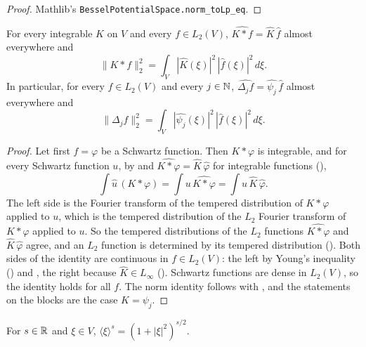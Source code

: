 \begin{proof}
\leanok
Mathlib's \texttt{BesselPotentialSpace.\allowbreak norm\_\allowbreak toLp\_\allowbreak eq}.
\end{proof}

\begin{theorem}
\label{thm:convolution-theorem-l2}
\leanok
{}
For every integrable $K$ on $V$ and every $f \in L_2(V)$,
$\widehat{K * f} = \widehat K \, \widehat f$ almost everywhere and
\[
  \|K * f\|_2^2 = \int_V |\widehat K(\xi)|^2 \, |\widehat f(\xi)|^2 \, d\xi .
\]
In particular, for every $f \in L_2(V)$ and every $j \in \mathbb{N}$,
$\widehat{\Delta_j f} = \widehat{\psi_j} \, \widehat f$ almost everywhere and
\[
  \|\Delta_j f\|_2^2 = \int_V |\widehat{\psi_j}(\xi)|^2 \, |\widehat f(\xi)|^2 \, d\xi .
\]
\end{theorem}

\begin{proof}
\leanok
Let first $f = \varphi$ be a Schwartz function. Then $K * \varphi$ is integrable, and for every
Schwartz function $u$, by  and
$\widehat{K * \varphi} = \widehat K \, \widehat \varphi$ for integrable functions
(),
\[
  \int \widehat u \, (K * \varphi) = \int u \, \widehat{K * \varphi}
  = \int u \, \widehat K \, \widehat \varphi .
\]
The left side is the Fourier transform of the tempered distribution of $K * \varphi$ applied to
$u$, which is the tempered distribution of the $L_2$ Fourier transform of $K * \varphi$ applied
to $u$. So the tempered distributions of the $L_2$ functions $\widehat{K * \varphi}$ and
$\widehat K \, \widehat \varphi$ agree, and an $L_2$ function is determined by its tempered
distribution (). Both sides of the identity are continuous
in $f \in L_2(V)$: the left by
Young's inequality () and , the right because
$\widehat K \in L_\infty$ (). Schwartz functions are dense in
$L_2(V)$, so the identity holds for all $f$. The norm identity follows with
, and the statements on the blocks are the case $K = \psi_j$.
\end{proof}

\begin{definition}
\label{def:bessel-weight}
\leanok
For $s \in \mathbb{R}$ and $\xi \in V$, $\langle \xi \rangle^s = (1 + |\xi|^2)^{s/2}$.
\end{definition}

